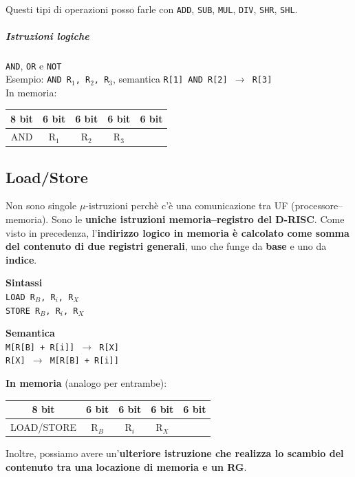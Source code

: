 \documentclass[10pt]{report}
\begin{document}
\paragraph{} Questi tipi di operazioni posso farle con \texttt{ADD}, \texttt{SUB}, \texttt{MUL}, \texttt{DIV}, \texttt{SHR}, \texttt{SHL}.
\subparagraph{Istruzioni logiche} \texttt{AND}, \texttt{OR} e \texttt{NOT}\\
Esempio: \texttt{AND R$_1$, R$_2$, R$_3$}, semantica \texttt{R[1] AND R[2] $\rightarrow$ R[3]}\\
In memoria: \begin{tabular}{| c | c | c | c | c |}
\hline
8 bit & 6 bit & 6 bit & 6 bit & 6 bit\\
\hline
AND & R$_1$ & R$_2$ & R$_3$  & \\
\hline
\end{tabular}
\pagebreak
\subsection{Load/Store}
Non sono singole $\mu$-istruzioni perchè c'è una comunicazione tra UF (processore--memoria). Sono le \textbf{uniche istruzioni memoria--registro del D-RISC}. Come visto in precedenza, l'\textbf{indirizzo logico in memoria è calcolato come somma del contenuto di due registri generali}, uno che funge da \textbf{base} e uno da \textbf{indice}.
\begin{multicols}{2}
\begin{center}
\textbf{Sintassi}\\
\texttt{LOAD R$_B$, R$_i$, R$_X$}\\
\texttt{STORE R$_B$, R$_i$, R$_X$}
\end{center}
\columnbreak
\begin{center}
\textbf{Semantica}\\
\texttt{M[R[B] + R[i]] $\rightarrow$ R[X]}\\
\texttt{R[X] $\rightarrow$ M[R[B] + R[i]]}
\end{center}
\end{multicols}
\begin{center}
\textbf{In memoria} (analogo per entrambe):  
\begin{tabular}{| c | c | c | c | c |}
\hline
8 bit & 6 bit & 6 bit & 6 bit & 6 bit\\
\hline
LOAD/STORE & R$_B$ & R$_i$ & R$_X$  & \\
\hline
\end{tabular}
\end{center}
Inoltre, possiamo avere un'\textbf{ulteriore istruzione che realizza lo scambio del contenuto tra una locazione di memoria e un RG}.
\end{document}
